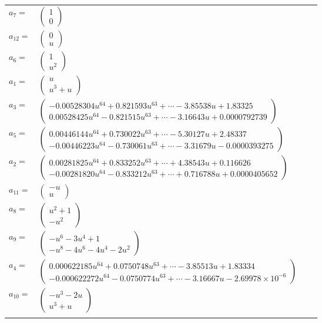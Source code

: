 \documentclass[1p]{elsarticle_modified}
\theoremstyle{definition}
\begin{document}
\begin{tabular}{m{7pt} m{180pt} m{7pt} m{180pt} }
\flushright $a_{7}=$&$\begin{pmatrix}1\\0\end{pmatrix}$ \\
\flushright $a_{12}=$&$\begin{pmatrix}0\\u\end{pmatrix}$ \\
\flushright $a_{6}=$&$\begin{pmatrix}1\\u^2\end{pmatrix}$ \\
\flushright $a_{1}=$&$\begin{pmatrix}u\\u^3+u\end{pmatrix}$ \\
\flushright $a_{3}=$&$\begin{pmatrix}-0.00528304 u^{64}+0.821593 u^{63}+\cdots-3.85538 u+1.83325\\0.00528425 u^{64}-0.821515 u^{63}+\cdots-3.16643 u+0.0000792739\end{pmatrix}$ \\
\flushright $a_{5}=$&$\begin{pmatrix}0.00446144 u^{64}+0.730022 u^{63}+\cdots-5.30127 u+2.48337\\-0.00446223 u^{64}-0.730061 u^{63}+\cdots-3.31679 u-0.0000393275\end{pmatrix}$ \\
\flushright $a_{2}=$&$\begin{pmatrix}0.00281825 u^{64}+0.833252 u^{63}+\cdots+4.38543 u+0.116626\\-0.00281820 u^{64}-0.833212 u^{63}+\cdots+0.716788 u+0.0000405652\end{pmatrix}$ \\
\flushright $a_{11}=$&$\begin{pmatrix}- u\\u\end{pmatrix}$ \\
\flushright $a_{8}=$&$\begin{pmatrix}u^2+1\\- u^2\end{pmatrix}$ \\
\flushright $a_{9}=$&$\begin{pmatrix}- u^6-3 u^4+1\\- u^8-4 u^6-4 u^4-2 u^2\end{pmatrix}$ \\
\flushright $a_{4}=$&$\begin{pmatrix}0.000622185 u^{64}+0.0750748 u^{63}+\cdots-3.85513 u+1.83334\\-0.000622272 u^{64}-0.0750774 u^{63}+\cdots-3.16667 u-2.69978\times10^{-6}\end{pmatrix}$ \\
\flushright $a_{10}=$&$\begin{pmatrix}- u^3-2 u\\u^3+u\end{pmatrix}$\\&\end{tabular}
\end{document}
